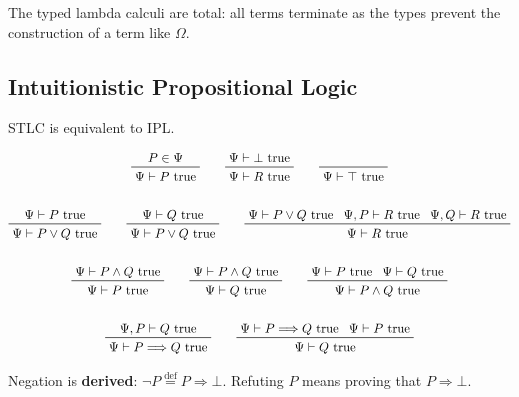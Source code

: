 \documentclass[11pt]{article}
\begin{document}
{{        The typed lambda calculi are total: all terms terminate as the types prevent the construction of a term like
        \(\Omega\).

        \subsection*{Intuitionistic Propositional Logic}
        {
            STLC is equivalent to IPL.

            \begin{gather*}
            \prftree[r]{}
            {P\in\Psi}
            {\Psi\vdash P\text{ true}}
            \qquad
            \prftree[r]{}
            {\Psi\vdash\bot\text{ true}}
            {\Psi\vdash R\text{ true}}
            \qquad
            \prftree[r]{}
            {\Psi\vdash \top\text{ true}}
            \\
            \\
            \prftree[r]{}
            {\Psi\vdash P\text{ true}}
            {\Psi\vdash P \vee Q\text{ true}}
            \qquad
            \prftree[r]{}
            {\Psi\vdash Q\text{ true}}
            {\Psi\vdash P \vee Q\text{ true}}
            \qquad
            \prftree[r]{}
            {\Psi\vdash P \vee Q\text{ true}}
            {\Psi,P\vdash R\text{ true}}
            {\Psi,Q\vdash R\text{ true}}
            {\Psi\vdash R\text{ true}}
            \\
            \\
            \prftree[r]{}
            {\Psi\vdash P \wedge Q\text{ true}}
            {\Psi\vdash P \text{ true}}
            \qquad
            \prftree[r]{}
            {\Psi\vdash P \wedge Q\text{ true}}
            {\Psi\vdash Q \text{ true}}
            \qquad
            \prftree[r]{}
            {\Psi\vdash P \text{ true}}
            {\Psi\vdash Q \text{ true}}
            {\Psi\vdash P \wedge Q\text{ true}}
            \\
            \\
            \prftree[r]{}
            {\Psi,P\vdash Q\text{ true}}
            {\Psi\vdash P \Longrightarrow Q\text{ true}}
            \qquad
            \prftree[r]{}
            {\Psi\vdash P \Longrightarrow Q\text{ true}}
            {\Psi\vdash P\text{ true}}
            {\Psi\vdash Q\text{ true}}
            \end{gather*}

            Negation is \textbf{derived}: \(\neg P \stackrel{\text{def}}{=}P\Longrightarrow\bot\). Refuting \(P\) means
            proving that \(P\Longrightarrow\bot\).

}}}
\end{document}
